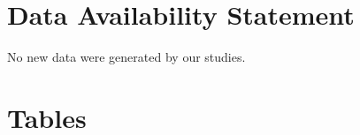 \documentclass[utf8]{FrontiersinHarvard} %
\begin{document}
\section*{Data Availability Statement}

No new data were generated by our studies.


\nocite{*}


\section*{Tables}
\end{document}
